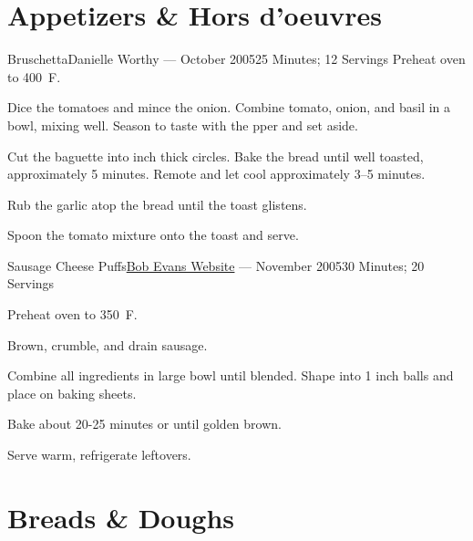 \documentclass{article}
\begin{document}
\renewcommand*{\recipetitlefont}{\large\bfseries}

\tableofcontents

\section{Appetizers \& Hors d'oeuvres}

\begin{recipe}{Bruschetta}{Danielle Worthy --- October 2005}{25 Minutes; 12 Servings}
   \newstep 
   Preheat oven to 400\ \0F. 

   Dice the tomatoes and mince the onion.  Combine tomato, onion, and basil in a
   bowl, mixing well.  Season to taste with the pper and set aside.

   Cut the baguette into  inch thick circles.  Bake the bread until well
   toasted, approximately 5 minutes.  Remote and let cool approximately 3--5
   minutes.

   Rub the garlic atop the bread until the toast glistens.

   \newstep
   Spoon the tomato mixture onto the toast and serve.   

\end{recipe}

\begin{recipe}{Sausage Cheese Puffs}{\href{http://www.bobevans.com/Recipe/17/Sausage-Cheese-Puffs}{Bob Evans Website} --- November 2005}{30 Minutes; 20 Servings}

   \newstep
   Preheat oven to 350\ \0F. 

   Brown, crumble, and drain sausage.

   Combine all ingredients in large bowl until blended.  Shape into 1 inch balls
   and place on baking sheets.

   \newstep
   Bake about 20-25 minutes or until golden brown.

   \freeform
   Serve warm, refrigerate leftovers.

\end{recipe}

\section{Breads \& Doughs}
\end{document}
